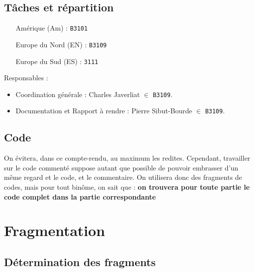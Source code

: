 \documentclass[10pt,a4paper]{article}
\theoremstyle{plain}
\begin{document}
\subsection{Tâches et répartition}
\begin{itemize}
    \item[Amérique (Am) :] \verb|B3101|
    \item[Europe du Nord (EN) :] \verb|B3109|
    \item[Europe du Sud (ES) :] \verb|3111|
\end{itemize}
Responsables : \\
\begin{itemize}
    \item Coordination générale : Charles Javerliat $\in$ \verb|B3109|.
    \item Documentation et Rapport à rendre : Pierre Sibut-Bourde $\in$ \verb|B3109|.
\end{itemize}

\subsection{Code}
On évitera, dans ce compte-rendu, au maximum les redites. Cependant, travailler sur le code commenté suppose autant que possible de pouvoir embrasser d'un même regard et le code, et le commentaire. On utilisera donc des fragments de codes, mais pour tout binôme, on sait que :
{\color{red}\textbf{on trouvera pour toute partie le code complet dans la partie correspondante\fg{}}}

\section{Fragmentation}
\subsection{Détermination des fragments}
\end{document}
